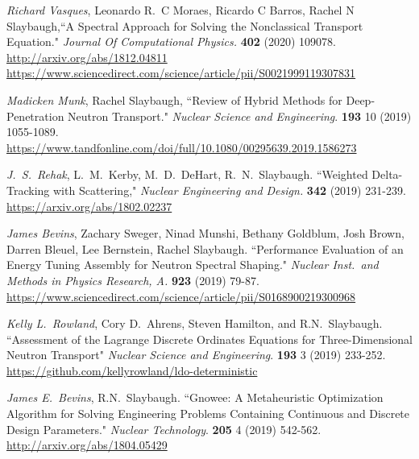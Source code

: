 \begin{bibsection}
\item \textit{Richard Vasques},  Leonardo R.\ C Moraes, Ricardo C Barros, Rachel
N Slaybaugh,``A Spectral Approach for Solving the Nonclassical Transport
Equation." \textit{Journal Of Computational Physics.} \textbf{402} (2020)
109078.\\
\url{http://arxiv.org/abs/1812.04811}\\
\url{https://www.sciencedirect.com/science/article/pii/S0021999119307831}

\item \textit{Madicken Munk}, Rachel Slaybaugh, ``Review of Hybrid Methods for Deep-Penetration Neutron Transport."  \textit{Nuclear Science and Engineering}. \textbf{193} 10 (2019) 1055-1089.\\
\url{https://www.tandfonline.com/doi/full/10.1080/00295639.2019.1586273}

\item \textit{J.\ S.\ Rehak}, L.\ M.\ Kerby, M.\ D.\ DeHart, R.\ N.\ Slaybaugh. ``Weighted Delta-Tracking with Scattering," \textit{Nuclear Engineering and Design.} \textbf{342} (2019) 231-239. \\
\url{https://arxiv.org/abs/1802.02237}

\item \textit{James Bevins}, Zachary Sweger, Ninad Munshi, Bethany Goldblum, Josh Brown, Darren Bleuel, Lee Bernstein, Rachel Slaybaugh. ``Performance Evaluation of an Energy Tuning Assembly for Neutron Spectral Shaping." \textit{Nuclear Inst.\ and Methods in Physics Research, A.} \textbf{923} (2019) 79-87.\\
\url{https://www.sciencedirect.com/science/article/pii/S0168900219300968}

\item \textit{Kelly L.\ Rowland}, Cory D.\ Ahrens, Steven Hamilton, and R.N.\ Slaybaugh. ``Assessment of the Lagrange Discrete Ordinates Equations for Three-Dimensional Neutron Transport"  \textit{Nuclear Science and Engineering}. \textbf{193} 3 (2019) 233-252.\\
\url{https://github.com/kellyrowland/ldo-deterministic}

\item \textit{James E.\ Bevins}, R.N.\ Slaybaugh. ``Gnowee: A Metaheuristic Optimization Algorithm for Solving Engineering Problems Containing Continuous and Discrete Design Parameters." \textit{Nuclear Technology}. \textbf{205} 4 (2019) 542-562.\\
\url{http://arxiv.org/abs/1804.05429}


\end{bibsection}

